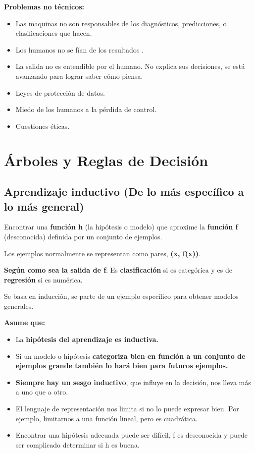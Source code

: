 \documentclass[12pt]{report} %
\begin{document}
\textbf{Problemas no técnicos:}

\begin{itemize}
\item
  Las maquinas no son responsables de los diagnósticos, predicciones, o
  clasificaciones que hacen.
\item
  Los humanos no se fían de los resultados .
\item
  La salida no es entendible por el humano. No explica sus decisiones,
  se está avanzando para lograr saber cómo piensa.
\item
  Leyes de protección de datos.
\item
  Miedo de los humanos a la pérdida de control.
\item
  Cuestiones éticas.
\end{itemize}

\chapter{Árboles y Reglas de Decisión}

\section{Aprendizaje inductivo (De lo más específico a lo más general)}

Encontrar una \textbf{función h} (la hipótesis o modelo) que aproxime la
\textbf{función f} (desconocida) definida por un conjunto de ejemplos.

Los ejemplos normalmente se representan como pares, \textbf{(x, f(x))}.

\textbf{Según como sea la salida de f}: Es \textbf{clasificación} si es
categórica y es de \textbf{regresión} si es numérica.

Se basa en inducción, se parte de un ejemplo específico para obtener
modelos generales.

\textbf{Asume que:}

\begin{itemize}
\item
  La \textbf{hipótesis del aprendizaje es inductiva.}
\item
  Si un modelo o hipótesis \textbf{categoriza bien en función a un
  conjunto de ejemplos grande también lo hará bien para futuros
  ejemplos.}
\item
  \textbf{Siempre hay un sesgo inductivo}, que influye en la decisión,
  nos lleva más a uno que a otro.
\item
  El lenguaje de representación nos limita si no lo puede expresar bien.
  Por ejemplo, limitarnos a una función lineal, pero es cuadrática.
\item
  Encontrar una hipótesis adecuada puede ser difícil, f es desconocida y
  puede ser complicado determinar si h es buena.
\end{itemize}
\end{document}

